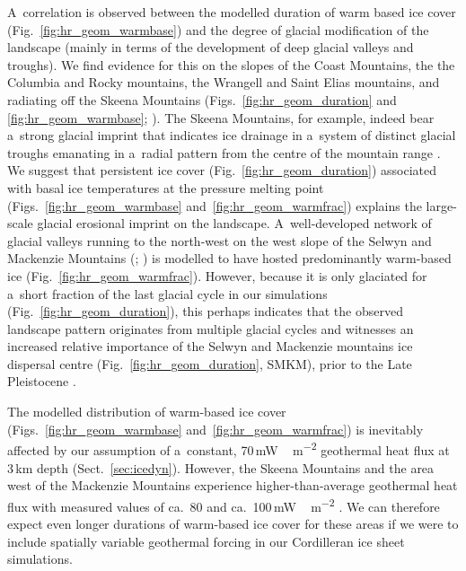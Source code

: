 \documentclass[tc, manuscript]{copernicus}
\begin{document}
      A~correlation is observed between the modelled duration of warm based
      ice cover (Fig.~\ref{fig:hr_geom_warmbase}) and the degree of glacial
      modification of the landscape (mainly in terms of the development of
      deep glacial valleys and troughs). We find evidence for this on the
      slopes of the Coast Mountains, the the Columbia and Rocky mountains,
      the Wrangell and Saint Elias mountains, and radiating off the Skeena
      Mountains (Figs.~\ref{fig:hr_geom_duration} and
      \ref{fig:hr_geom_warmbase}; \citealp[Fig.~2]{Kleman.etal.2010}). The
      Skeena Mountains, for example, indeed bear a~strong glacial imprint
      that indicates ice drainage in a~system of distinct glacial troughs
      emanating in a~radial pattern from the centre of the mountain range
      \citep[Fig.~2]{Kleman.etal.2010}. We suggest that persistent ice cover
      (Fig.~\ref{fig:hr_geom_duration}) associated with basal ice
      temperatures at the pressure melting point
      (Figs.~\ref{fig:hr_geom_warmbase} and~\ref{fig:hr_geom_warmfrac})
      explains the large-scale glacial erosional imprint on the landscape.
      A~well-developed network of glacial valleys running to the north-west
      on the west slope of the Selwyn and Mackenzie Mountains
      (\citealp[Fig.~2]{Kleman.etal.2010}; \citealp[Fig.~8]
      {Stroeven.etal.2010}) is modelled to have hosted predominantly
      warm-based ice (Fig.~\ref{fig:hr_geom_warmfrac}). However, because it
      is only glaciated for a~short fraction of the last glacial cycle in
      our simulations (Fig.~\ref{fig:hr_geom_duration}), this perhaps
      indicates that the observed landscape pattern originates from multiple
      glacial cycles and witnesses an increased relative importance of the
      Selwyn and Mackenzie mountains ice dispersal centre
      (Fig.~\ref{fig:hr_geom_duration}, SMKM), prior to the Late Pleistocene
      \citep[cf.][]{Ward.etal.2008, Demuro.etal.2012}.

      The modelled distribution of warm-based ice cover
      (Figs.~\ref{fig:hr_geom_warmbase} and~\ref{fig:hr_geom_warmfrac}) is
      inevitably affected by our assumption of a~constant,
      70\,\unit{mW\,m^{-2}} geothermal heat flux at 3\,\unit{km} depth
      (Sect.~\ref{sec:icedyn}). However, the Skeena Mountains and the area
      west of the Mackenzie Mountains experience higher-than-average
      geothermal heat flux with measured values of ca.~80 and
      ca.~100\,\unit{mW\,m^{-2}} \citep{Blackwell.Richards.2004}. We can
      therefore expect even longer durations of warm-based ice cover for
      these areas if we were to include spatially variable geothermal
      forcing in our Cordilleran ice sheet simulations.
\end{document}
